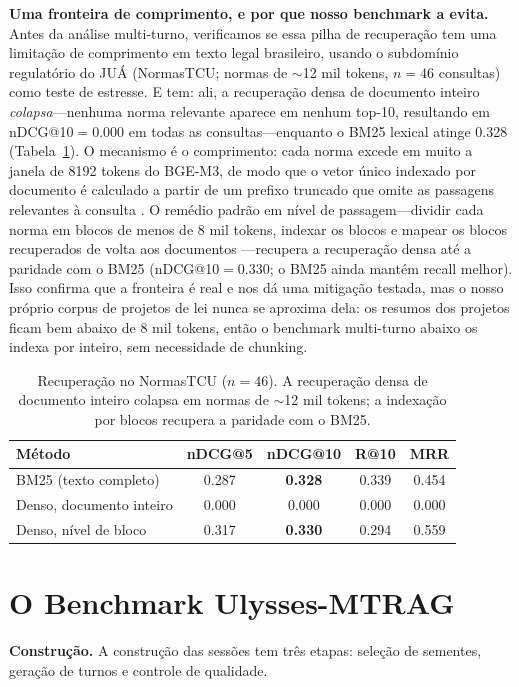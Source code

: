 \documentclass[conference]{IEEEtran}
\begin{document}
\textbf{Uma fronteira de comprimento, e por que nosso benchmark a evita.} Antes
da análise multi-turno, verificamos se essa pilha de recuperação tem uma
limitação de comprimento em texto legal brasileiro, usando o subdomínio
regulatório do JU\'A \cite{Pereira2026JUA} (NormasTCU; normas de
$\sim$12 mil tokens, $n{=}46$ consultas) como teste de estresse. E tem: ali, a
recuperação densa de documento inteiro \emph{colapsa}---nenhuma norma relevante
aparece em nenhum top-10, resultando em nDCG@10$=$0.000 em todas as
consultas---enquanto o BM25 lexical atinge 0.328 (Tabela~\ref{tab:chunking}). O
mecanismo é o comprimento: cada norma excede em muito a janela de 8192 tokens do
BGE-M3, de modo que o vetor único indexado por documento é calculado a partir de
um prefixo truncado que omite as passagens relevantes à consulta
\cite{Chen2024BGEM3,Zhou2024LengthCollapse}. O remédio padrão em nível de
passagem---dividir cada norma em blocos de menos de 8 mil tokens, indexar os
blocos e mapear os blocos recuperados de volta aos documentos
\cite{Dai2019Deeper,Karpukhin2020DPR}---recupera a recuperação densa até a
paridade com o BM25 (nDCG@10$=$0.330; o BM25 ainda mantém recall melhor). Isso
confirma que a fronteira é real e nos dá uma mitigação testada, mas o nosso
próprio corpus de projetos de lei nunca se aproxima dela: os resumos dos
projetos ficam bem abaixo de 8 mil tokens, então o benchmark multi-turno abaixo
os indexa por inteiro, sem necessidade de chunking.

\begin{table}[t]
\caption{Recuperação no NormasTCU ($n{=}46$). A recuperação densa de documento
inteiro colapsa em normas de $\sim$12 mil tokens; a indexação por blocos
recupera a paridade com o BM25.}
\label{tab:chunking}
\centering
\begin{tabular}{lcccc}
\toprule
\textbf{Método} & \textbf{nDCG@5} & \textbf{nDCG@10} & \textbf{R@10} & \textbf{MRR} \\
\midrule
BM25 (texto completo)     & 0.287 & \textbf{0.328} & 0.339 & 0.454 \\
Denso, documento inteiro  & 0.000 & 0.000 & 0.000 & 0.000 \\
Denso, nível de bloco     & 0.317 & \textbf{0.330} & 0.294 & 0.559 \\
\bottomrule
\end{tabular}
\end{table}

\section{O Benchmark Ulysses-MTRAG}
\label{sec:benchmark}
\textbf{Construção.} A construção das sessões tem três etapas: seleção de
sementes, geração de turnos e controle de qualidade.
\end{document}
